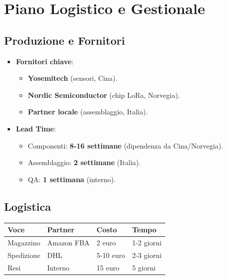 \documentclass[11pt,a4paper]{report}
\begin{document}
\chapter{Piano Logistico e Gestionale}
\label{ch:operations}

\section{Produzione e Fornitori}
\begin{itemize}
\item {\bf Fornitori chiave}:
  \begin{itemize}
  \item {\bf Yosemitech} (sensori, Cina).
  \item {\bf Nordic Semiconductor} (chip LoRa, Norvegia).
  \item {\bf Partner locale} (assemblaggio, Italia).
  \end{itemize}
\item {\bf Lead Time}:
  \begin{itemize}
  \item Componenti: {\bf 8-16 settimane} (dipendenza da Cina/Norvegia).
  \item Assemblaggio: {\bf 2 settimane} (Italia).
  \item QA: {\bf 1 settimana} (interno).
  \end{itemize}
\end{itemize}

\section{Logistica}
\begin{longtable}{|L{2.5cm}|L{2.5cm}|C{1.5cm}|L{2cm}|}
\hline
{\bf Voce} & {\bf Partner} & {\bf Costo} & {\bf Tempo} \\ \hline
Magazzino & Amazon FBA & 2 euro & 1-2 giorni \\
Spedizione & DHL & 5-10 euro & 2-3 giorni \\
Resi & Interno & 15 euro & 5 giorni \\ \hline
\end{longtable}
\end{document}
